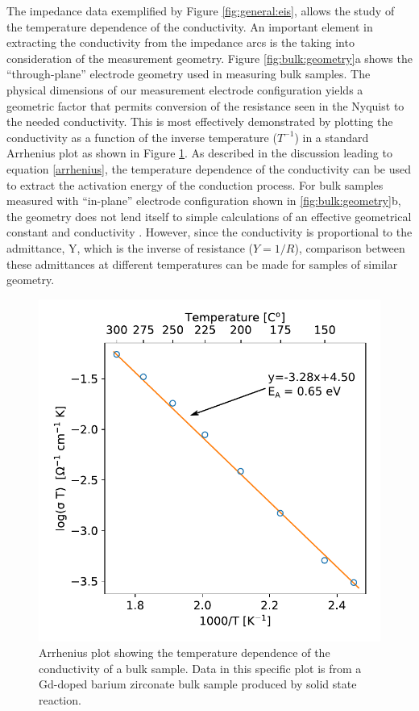 The impedance data exemplified by Figure \ref{fig:general:eis}, allows the study of the temperature dependence of the conductivity. An important element in extracting the conductivity from the impedance arcs is the taking into consideration of the measurement geometry. Figure \ref{fig:bulk:geometry}a shows the ``through-plane'' electrode geometry used in measuring bulk samples. The physical dimensions of our measurement electrode configuration yields a geometric factor that permits conversion of the resistance seen in the Nyquist to the needed conductivity. This is most effectively demonstrated by plotting the conductivity as a function of the inverse temperature ($T^{-1}$) in a standard Arrhenius plot as shown in Figure \ref{fig:general:arrhenius}. As described in the discussion leading to equation \ref{arrhenius}, the temperature dependence of the conductivity can be used to extract the activation energy of the conduction process. For bulk samples measured with ``in-plane'' electrode configuration shown in \ref{fig:bulk:geometry}b, the geometry does not lend itself to simple calculations of an effective geometrical constant and conductivity \cite{Jacobs1995}. However, since the conductivity is proportional to the admittance, Y, which is the inverse of resistance ($Y = 1/R$), comparison between these admittances at different temperatures can be made for samples of similar geometry. 

\begin{figure}
\centering
\includegraphics{Figures/170715-bzgxs10-pellet-thr-plane-air-edit.pdf}
  \caption{Arrhenius plot showing the temperature dependence of the conductivity of a bulk sample. Data in this specific plot is from a Gd-doped barium zirconate bulk sample produced by solid state reaction.}
  \label{fig:general:arrhenius}
\end{figure}
